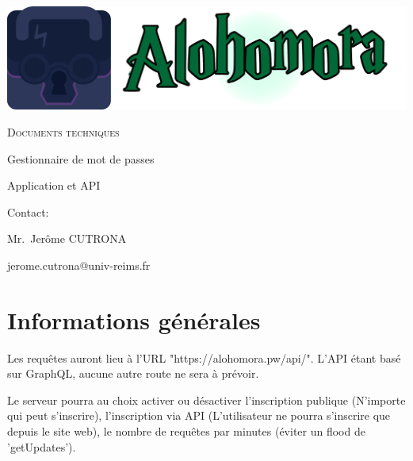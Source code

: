 \documentclass[oneside]{report}
\author{Sylvain COMBRAQUE, Sarah LAMOTTE, Nathan JANCZEWSKI, Léo BERGEROT}
\begin{document}
	\begin{titlepage}
		\centering
		\includegraphics[scale=.125]{logo_large}
		\vspace{5cm}
		{\par\scshape\Huge Documents techniques\par}
		\vspace{5cm}
		{\par Gestionnaire de mot de passes\par}
		{\par Application et API\par}
		\vfill
		\par Contact:
		{\par\small Mr.\ Jerôme CUTRONA \par}
		\par jerome.cutrona@univ-reims.fr\
	\end{titlepage}

	\pagestyle{fancy}
	\fancyhf{}
	\tableofcontents

	\chapter{Informations générales}
	\vspace{2cm}
	\par Les requêtes auront lieu à l'URL "https://alohomora.pw/api/". L'API étant basé sur GraphQL, aucune autre route ne sera à prévoir.\\
	\par Le serveur pourra au choix activer ou désactiver l'inscription publique (N'importe qui peut s'inscrire), l'inscription via API (L'utilisateur ne pourra s'inscrire que depuis le site web), le nombre de requêtes par minutes (éviter un flood de 'getUpdates').\\
\end{document}
